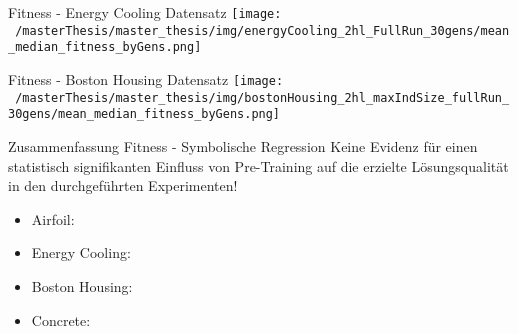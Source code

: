 \documentclass[
  ignorenonframetext,
]{beamer}
\providecommand{\tightlist}{%
  \setlength{\itemsep}{0pt}\setlength{\parskip}{0pt}}
\begin{document}
\begin{frame}{Fitness - Energy Cooling Datensatz}
\protect\hypertarget{fitness---energy-cooling-datensatz}{}
\texttt{[image: ~/masterThesis/master\_thesis/img/energyCooling\_2hl\_FullRun\_30gens/mean\_median\_fitness\_byGens.png]}
\end{frame}

\begin{frame}{Fitness - Boston Housing Datensatz}
\protect\hypertarget{fitness---boston-housing-datensatz}{}
\texttt{[image: ~/masterThesis/master\_thesis/img/bostonHousing\_2hl\_maxIndSize\_fullRun\_30gens/mean\_median\_fitness\_byGens.png]}
\end{frame}

\begin{frame}{Zusammenfassung Fitness - Symbolische Regression}
\protect\hypertarget{zusammenfassung-fitness---symbolische-regression}{}
Keine Evidenz für einen statistisch signifikanten Einfluss von
Pre-Training auf die erzielte Lösungsqualität in den durchgeführten
Experimenten!

\begin{itemize}
\tightlist
\item
  Airfoil:
\item
  Energy Cooling:
\item
  Boston Housing:
\item
  Concrete:
\end{itemize}
\end{frame}
\end{document}
